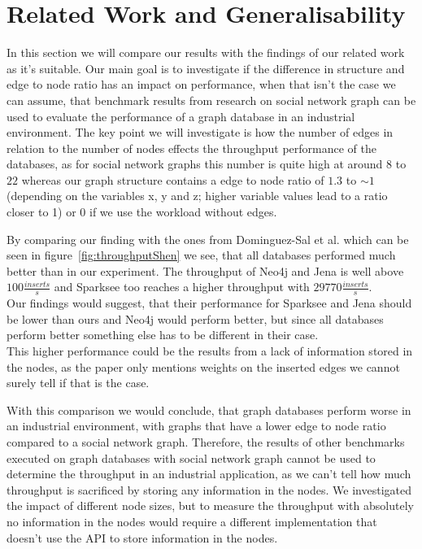 \section{Related Work and Generalisability}
\label{ch:evaluation:se:relatedWorkAndGeneralisability}
In this section we will compare our results with the findings of our related work as it's suitable.
Our main goal is to investigate if the difference in structure and edge to node ratio has an impact on performance,
when that isn't the case we can assume,
that benchmark results from research on social network graph can be used to evaluate the performance of a graph database in an industrial environment.
The key point we will investigate is how the number of edges in relation to the number of nodes effects the throughput performance of the databases,
as for social network graphs this number is quite high at around $ 8 $\cite[41]{TaoShen} to $ 22 $\cite{Dayarathna2012} whereas our graph structure contains a edge to node ratio of $ 1.3 $ to $ \sim1 $ (depending on the variables x, y and z; higher variable values lead to a ratio closer to 1) or $ 0 $ if we use the workload without edges.

By comparing our finding with the ones from Dominguez-Sal et al.\cite{TaoShen} which can be seen in figure~\ref{fig:throughputShen} we see,
that all databases performed much better than in our experiment.
The throughput of Neo4j and Jena is well above $ 100 \frac{inserts}{s} $ and Sparksee too reaches a higher throughput with $ 29770 \frac{inserts}{s} $.\\
Our findings would suggest,
that their performance for Sparksee and Jena should be lower than ours and Neo4j would perform better,
but since all databases perform better something else has to be different in their case.\\
This higher performance could be the results from a lack of information stored in the nodes,
as the paper only mentions weights on the inserted edges we cannot surely tell if that is the case.

With this comparison we would conclude,
that graph databases perform worse in an industrial environment,
with graphs that have a lower edge to node ratio compared to a social network graph.
Therefore,
the results of other benchmarks executed on graph databases with social network graph cannot be used to determine the throughput in an industrial application,
as we can't tell how much throughput is sacrificed by storing any information in the nodes.
We investigated the impact of different node sizes,
but to measure the throughput with absolutely no information in the nodes would require a different implementation that doesn't use the API to store information in the nodes.

